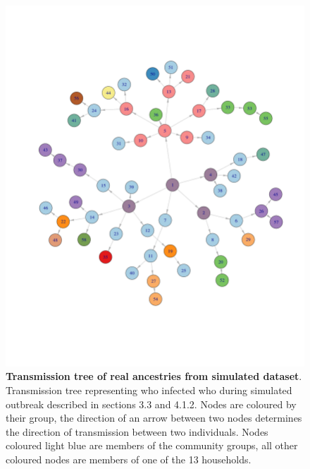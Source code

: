 \documentclass[11pt,a4paper]{report}
\begin{document}
\begin{figure}
\centering
\includegraphics[scale=0.4]{ancestree.png} \newline
\caption{{\bf Transmission tree of real ancestries from simulated dataset}. Transmission tree representing who infected who during simulated outbreak described in sections 3.3 and 4.1.2. Nodes are coloured by their group, the direction of an arrow between two nodes determines the direction of transmission between two individuals. Nodes coloured light blue are members of the community groups, all other coloured nodes are members of one of the 13 households.}
\end{figure}
\end{document}
